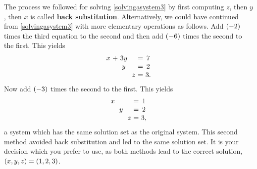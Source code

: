 \begin{solution}
  The process we followed for solving \eqref{solvingasystem3} by first
  computing $z$, then $y$, then $x$ is called \textbf{back
    substitution}.  Alternatively, we could
  have continued from \eqref{solvingasystem3} with more elementary
  operations as follows. Add $\left(-2\right) $ times the third
  equation to the second and then add $\left(-6\right) $ times the
  second to the first. This yields
  \begin{equation*}
    \allowbreak
    \begin{array}{c@{~}c@{~}c@{~}c@{~}c@{~}c@{~}c}
      x&+&3y&&&=&7 \\
      &&y&&&=&2 \\
      &&&&z&=&3.
    \end{array}
  \end{equation*}
  Now add $\left(-3\right) $ times the second to the first. This yields
  \begin{equation*}
    \allowbreak
    \begin{array}{c@{~}c@{~}c@{~}c@{~}c@{~}c@{~}c}
      x&&&&&=&1 \\
      &&y&&&=&2 \\
      &&&&z&=&3,
    \end{array}
  \end{equation*}
  a system which has the same solution set as the original
  system. This second method avoided back substitution and led to the
  same solution set. It is your decision which you prefer to use, as
  both methods lead to the correct solution,
  $\left(x,y,z \right) = \left(1,2,3\right)$.
\end{solution}

